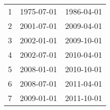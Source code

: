% 
\begin{tabular}{ccc}
  \hline
  \hline
1 & 1975-07-01 & 1986-04-01 \\ 
  2 & 2001-07-01 & 2009-04-01 \\ 
  3 & 2002-01-01 & 2009-10-01 \\ 
  4 & 2002-07-01 & 2010-04-01 \\ 
  5 & 2008-01-01 & 2010-10-01 \\ 
  6 & 2008-07-01 & 2011-04-01 \\ 
  7 & 2009-01-01 & 2011-10-01 \\ 
   \hline
\end{tabular}
